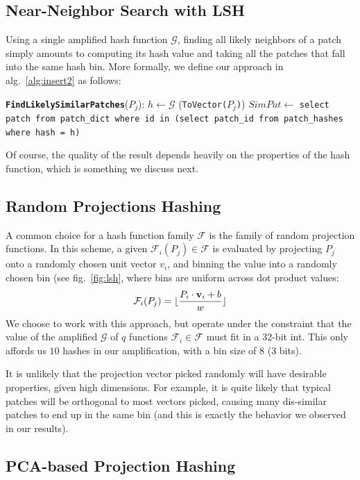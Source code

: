 \subsection{Near-Neighbor Search with LSH}\label{ssec:nn-lsh}

Using a single amplified hash function $\mathcal{G}$, finding
all likely neighbors of a patch simply amounts to computing
its hash value and taking all the patches that fall into the
same hash bin.
More formally, we define our approach
in alg.~\ref{alg:insert2} as follows:
\begin{algorithmic}[1]
\Statex \texttt{\textbf{FindLikelySimilarPatches}}($P_j$):
\State $h \leftarrow \mathcal{G}$ (\texttt{ToVector($P_j$)})
\State $SimPat \leftarrow$ \texttt{select patch from patch\_dict where id in
(select patch\_id from patch\_hashes where hash = h)}
\end{algorithmic}
Of course, the quality of the result depends heavily on the
properties of the hash function, which is something we discuss next.

\subsection{Random Projections Hashing}\label{ssec:naive-nn}

A common choice for a hash function family $\mathcal{F}$ is
the family of random projection functions. In this scheme,
a given $\mathcal{F}_i(P_j) \in \mathcal{F}$ is evaluated by
projecting $P_j$ onto a randomly chosen unit vector $v_i$,
and binning the value into a randomly chosen bin (see fig.~\ref{fig:lsh},
where bins are uniform across dot product values:
\begin{equation}
\mathcal{F}_i(P_j) = \lfloor\frac{P_i \cdot \mathbf{v}_i + b}{w}\rfloor
\end{equation}
We choose to work with this approach, but operate under
the constraint that the value of the amplified $\mathcal{G}$ of $q$
functions $\mathcal{F}_i \in \mathcal{F}$ must fit in a 32-bit int.
This only affords us $10$ hashes in our amplification,
with a bin size of $8$ (3 bits).

It is unlikely that the projection vector picked randomly
will have desirable properties, given high dimensions. For example,
it is quite likely that typical patches will be orthogonal to
most vectors picked, causing many dis-similar patches to
end up in the same bin (and this is exactly the behavior
we observed in our results).

\subsection{PCA-based Projection Hashing}\label{ssec:pca-nn}

